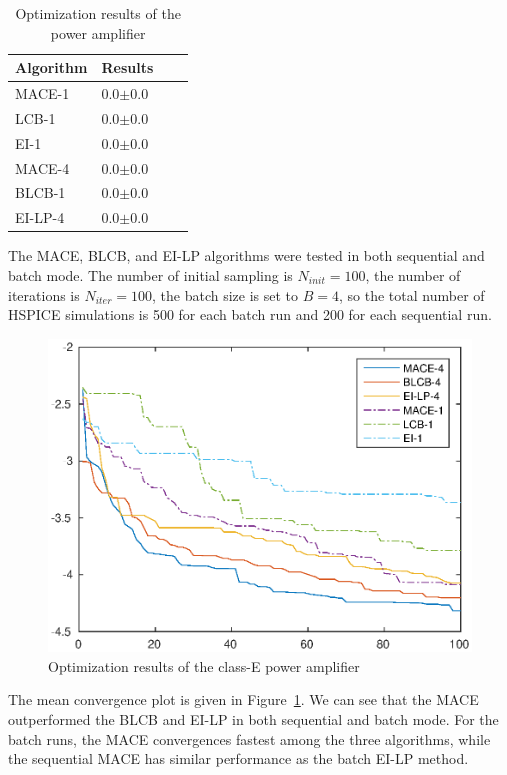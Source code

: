 \begin{table}[htbp]
    \centering
    \caption{Optimization results of the power amplifier}
    \label{tab:result_PA}
    \begin{tabular}{llll}
        \toprule
        Algorithm & Results     \\ \midrule
        MACE-1    & 0.0$\pm$0.0 \\
        LCB-1     & 0.0$\pm$0.0 \\
        EI-1      & 0.0$\pm$0.0 \\
        MACE-4    & 0.0$\pm$0.0 \\
        BLCB-1    & 0.0$\pm$0.0 \\
        EI-LP-4   & 0.0$\pm$0.0 \\
        \bottomrule
    \end{tabular}
\end{table}

The MACE, BLCB, and EI-LP algorithms were tested in both sequential and batch
mode. The number of initial sampling is $N_{init} = 100$, the number of
iterations is $N_{iter} = 100$, the batch size is set to $B = 4$, so the total
number of HSPICE simulations is 500 for each batch run and 200 for each
sequential run.


\begin{figure}[htbp]
\vskip 0.2in
\begin{center}
\centerline{\includegraphics[width=\columnwidth]{./img/ClassE_mean.eps}}
\caption{Optimization results of the class-E power amplifier}
\label{fig:resClassE}
\end{center}
\vskip -0.2in
\end{figure}

The mean convergence plot is given in Figure~\ref{fig:resClassE}. We can see
that the MACE outperformed the BLCB and EI-LP in both sequential and batch
mode. For the batch runs, the MACE convergences fastest among the three
algorithms, while the sequential MACE has similar performance as the batch
EI-LP method.
